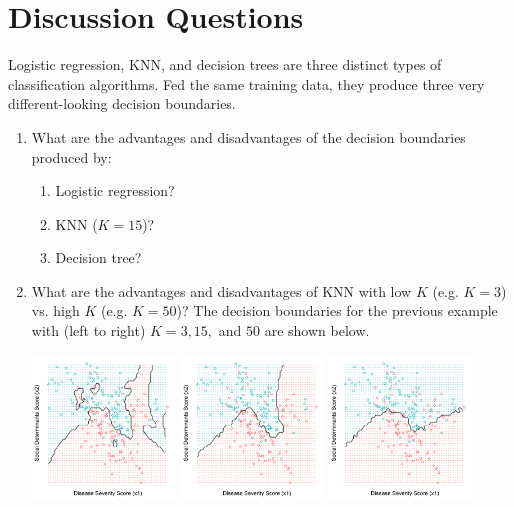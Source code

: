
\section{Discussion Questions}

Logistic regression, KNN, and decision trees are three distinct types of classification algorithms. Fed the same training data, they produce three very different-looking decision boundaries.

\begin{enumerate}
\item What are the advantages and disadvantages of the decision boundaries produced by:
  \begin{enumerate}
  \item Logistic regression?
  \item KNN ($K=15$)?
  \item Decision tree?
  \end{enumerate}
\item What are the advantages and disadvantages of KNN with low $K$ (e.g. $K=3$) vs. high $K$ (e.g. $K=50$)? The decision boundaries for the previous example with (left to right) $K=3, 15,$ and $50$ are shown below.
\begin{center}
\includegraphics[width=0.3\textwidth]{img/esl-knn-3.png}
\includegraphics[width=0.3\textwidth]{img/esl-knn-15.png}
\includegraphics[width=0.3\textwidth]{img/esl-knn-50.png}

\end{center}
\end{enumerate}
